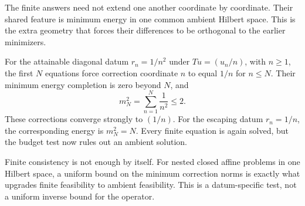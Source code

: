 The finite answers need not extend one another coordinate by coordinate. Their shared feature is minimum energy in one common ambient Hilbert space. This is the extra geometry that forces their differences to be orthogonal to the earlier minimizers.

For the attainable diagonal datum $r_n=1/n^2$ under $Tu=(u_n/n)$, with $n\ge1$, the first $N$ equations force correction coordinate $n$ to equal $1/n$ for $n\le N$. Their minimum energy completion is zero beyond $N$, and
\[
 m_N^2=\sum_{n=1}^{N}\frac1{n^2}\le2.
\]
These corrections converge strongly to $(1/n)$. For the escaping datum $r_n=1/n$, the corresponding energy is $m_N^2=N$. Every finite equation is again solved, but the budget test now rules out an ambient solution.


\begin{insight}
Finite consistency is not enough by itself. For nested closed affine problems in one Hilbert space, a uniform bound on the minimum correction norms is exactly what upgrades finite feasibility to ambient feasibility. This is a datum-specific test, not a uniform inverse bound for the operator.
\end{insight}
